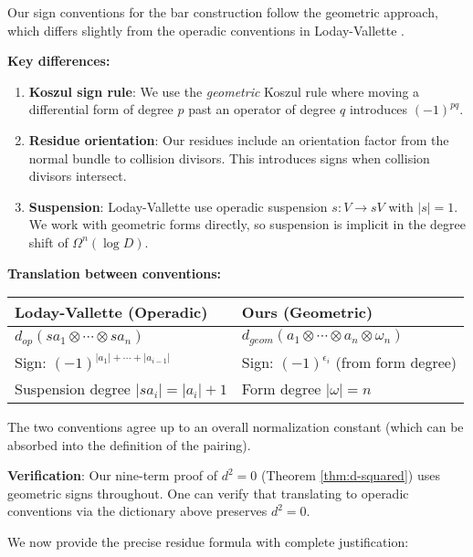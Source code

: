 \begin{remark}\label{rem:LV-signs}
Our sign conventions for the bar construction follow the geometric approach, which differs slightly from the operadic conventions in Loday-Vallette \cite{LodayVallette}.

\textbf{Key differences:}
\begin{enumerate}
\item \textbf{Koszul sign rule}: We use the \emph{geometric} Koszul rule where moving a differential form of degree $p$ past an operator of degree $q$ introduces $(-1)^{pq}$.

\item \textbf{Residue orientation}: Our residues include an orientation factor from the normal bundle to collision divisors. This introduces signs when collision divisors intersect.

\item \textbf{Suspension}: Loday-Vallette use operadic suspension $s: V \to sV$ with $|s| = 1$. We work with geometric forms directly, so suspension is implicit in the degree shift of $\Omega^n(\log D)$.
\end{enumerate}

\textbf{Translation between conventions:}
\begin{center}
\begin{tabular}{|l|l|}
\hline
\textbf{Loday-Vallette (Operadic)} & \textbf{Ours (Geometric)} \\
\hline
$d_{op}(s a_1 \otimes \cdots \otimes s a_n)$ & $d_{geom}(a_1 \otimes \cdots \otimes a_n \otimes \omega_n)$ \\
Sign: $(-1)^{|a_1| + \cdots + |a_{i-1}|}$ & Sign: $(-1)^{\epsilon_i}$ (from form degree) \\
Suspension degree $|s a_i| = |a_i| + 1$ & Form degree $|\omega| = n$ \\
\hline
\end{tabular}
\end{center}

The two conventions agree up to an overall normalization constant (which can be absorbed into the definition of the pairing).

\textbf{Verification}: Our nine-term proof of $d^2 = 0$ (Theorem \ref{thm:d-squared}) uses geometric signs throughout. One can verify that translating to operadic conventions via the dictionary above preserves $d^2 = 0$.
\end{remark}
 
 We now provide the precise residue formula with complete justification:
 
